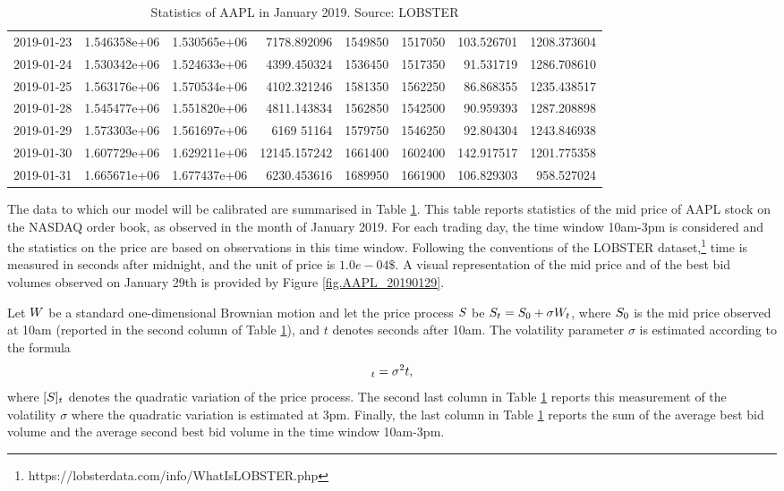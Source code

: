 \documentclass[10pt,a4paper]{article}
\begin{document}
\begin{table}
\begin{tiny}
{\begin{tabular}{lrrrrrrr}
					2019-01-23 &   1.546358e+06 &  1.530565e+06 &   7178.892096 &  1549850   &  1517050   &     103.526701 &  1208.373604 \\
					2019-01-24 &   1.530342e+06 &  1.524633e+06 &   4399.450324 &  1536450   &  1517350   &    91.531719 &  1286.708610 \\
					2019-01-25 &   1.563176e+06 &  1.570534e+06 &   4102.321246 &  1581350   &  1562250   &      86.868355 &  1235.438517 \\
					2019-01-28 &   1.545477e+06 &  1.551820e+06 &   4811.143834 &  1562850   &  1542500   &      90.959393 &  1287.208898 \\
					2019-01-29 &   1.573303e+06 &  1.561697e+06 &   6169  51164 &  1579750   &  1546250   &      92.804304 &  1243.846938 \\
					2019-01-30 &   1.607729e+06 &  1.629211e+06 &  12145.157242 &  1661400   &  1602400   &     142.917517 &  1201.775358 \\
					2019-01-31 &    1.665671e+06 &  1.677437e+06 &   6230.453616 &  1689950 &  1661900 &             106.829303 &   958.527024
					\\
				\end{tabular}
			}
		\end{tiny}
		\caption{{Statistics of AAPL in January 2019. Source: LOBSTER}}
		\label{tab.statAAPLjanuary2019}
	\end{table}
	
	The data to which our model will be calibrated are summarised in Table \ref{tab.statAAPLjanuary2019}. This table reports statistics of the mid price of AAPL stock on the NASDAQ order book, as observed in the month of January 2019. For each trading day, the time window 10am-3pm is considered and the statistics on the price are based on observations in this time window. Following the conventions of the LOBSTER dataset,\footnote{https://lobsterdata.com/info/WhatIsLOBSTER.php} time is measured in seconds after midnight, and the unit of price is $1.0e-04\$$. A visual representation of the mid price and of the best bid volumes observed on January 29th is provided by Figure \ref{fig.AAPL_20190129}.
	
	Let $W$ be a standard one-dimensional Brownian motion and let the price process $S$ be $S_t = S_0 + \sigma W_t$, where $S_0$ is the mid price observed at 10am (reported in the second column of Table \ref{tab.statAAPLjanuary2019}), and $t$ denotes seconds after 10am. The volatility parameter $\sigma$ is estimated according to the formula 
	\begin{equation*}
	[\fundamentalPrice]_t = \sigma\squared t,
	\end{equation*}
	where $[S]_t$ denotes the quadratic variation of the price process. The second last column in Table \ref{tab.statAAPLjanuary2019} reports this measurement of the volatility $\sigma$ where the quadratic variation is estimated at 3pm. Finally, the last column in Table \ref{tab.statAAPLjanuary2019} reports the sum of the average best bid volume and the average second best bid volume in the time window 10am-3pm.  
	
\end{document}

